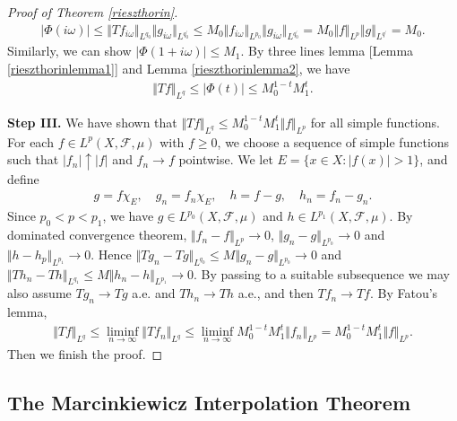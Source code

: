 \documentclass{article}
\numberwithin{equation}{section}
\newcommand{\scr}{\mathscr}
\theoremstyle{plain}
\theoremstyle{definition}
\begin{document}
\begin{proof}[Proof of Theorem \ref{rieszthorin}]
\begin{align*}
	\vert\Phi(i\omega)\vert\leq\Vert Tf_{i\omega}\Vert_{L^{q_0}}\Vert g_{i\omega}\Vert_{L^{q_0^\prime}}\leq M_0\Vert f_{i\omega}\Vert_{L^{p_0}}\Vert g_{i\omega}\Vert_{L^{q_0^\prime}}=M_0\Vert f\Vert_{L^p}\Vert g\Vert_{L^{q^\prime}}=M_0.
\end{align*}
Similarly, we can show $\vert\Phi(1+i\omega)\vert\leq M_1$. By three lines lemma [Lemma \ref{rieszthorinlemma1}] and Lemma \ref{rieszthorinlemma2}, we have
\begin{align*}
	\Vert Tf\Vert_{L^q}\leq\vert\Phi(t)\vert\leq M_0^{1-t}M_1^t.
\end{align*} 
\item\textbf{Step III.} We have shown that $\Vert Tf\Vert_{L^q}\leq  M_0^{1-t}M_1^t\Vert f\Vert_{L^p}$ for all simple functions. For each $f\in L^p(X,\scr{F},\mu)$ with $f\geq 0$, we choose a sequence of simple functions such that $\vert f_n\vert\uparrow\vert f\vert$ and $f_n\to f$ pointwise. We let $E=\{x\in X:\vert f(x)\vert>1\}$, and define
\begin{align*}
	g=f\chi_E,\quad g_n=f_n\chi_E,\quad h=f-g,\quad h_n=f_n-g_n.
\end{align*}
Since $p_0<p<p_1$, we have $g\in L^{p_0}(X,\scr{F},\mu)$ and $h\in L^{p_1}(X,\scr{F},\mu)$. By dominated convergence theorem, $\Vert f_n-f\Vert_{L^p}\to 0$, $\Vert g_n-g\Vert_{L^{p_0}}\to 0$ and $\Vert h-h_p\Vert_{L^{p_1}}\to 0$. Hence $\Vert Tg_n-Tg\Vert_{L^{q_0}}\leq M\Vert g_n-g\Vert_{L^{p_0}}\to 0$ and $\Vert Th_n-Th\Vert_{L^{q_1}}\leq M\Vert h_n-h\Vert_{L^{p_1}}\to 0$. By passing to a suitable subsequence we may also assume $Tg_n\to Tg$ a.e. and $Th_n\to Th$ a.e., and then $Tf_n\to Tf$. By Fatou's lemma,
\begin{align*}
	\Vert Tf\Vert_{L^q}\leq\liminf_{n\to\infty}\Vert Tf_n\Vert_{L^q}\leq \liminf_{n\to\infty}M_0^{1-t}M_1^t\Vert f_n\Vert_{L^p}=M_0^{1-t}M_1^t\Vert f\Vert_{L^p}.
\end{align*}
Then we finish the proof.
\end{proof}

\newpage
\subsection{The Marcinkiewicz Interpolation Theorem}
\end{document}
